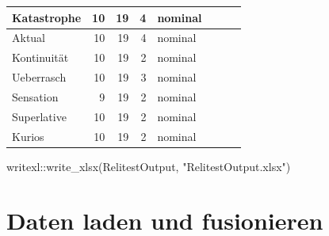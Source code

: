 \documentclass[twoside, pagesize, fontsize=11pt, dvipsnames]{scrreport}
\newenvironment{Shaded}{\begin{snugshade}}{\end{snugshade}}
\newcommand{\FunctionTok}[1]{\textcolor[rgb]{0.28,0.35,0.67}{#1}}
\newcommand{\NormalTok}[1]{\textcolor[rgb]{0.00,0.23,0.31}{#1}}
\newcommand{\SpecialCharTok}[1]{\textcolor[rgb]{0.37,0.37,0.37}{#1}}
\newcommand{\StringTok}[1]{\textcolor[rgb]{0.13,0.47,0.30}{#1}}
\begin{document}
\begin{table}
\begin{tabular}[t]{l|r|r|r|l|>{}r|>{}r|>{}r}
\hline
Katastrophe & 10 & 19 & 4 & nominal & \cellcolor[HTML]{E9D539}{\textcolor{black}{0.39}} & \cellcolor[HTML]{65FD69}{\textcolor{black}{0.81}} & \cellcolor[HTML]{75FE5C}{\textcolor{black}{0.74}}\\
\hline
Aktual & 10 & 19 & 4 & nominal & \cellcolor[HTML]{A91601}{\textcolor{white}{0.07}} & \cellcolor[HTML]{7A0403}{\textcolor{white}{0.56}} & \cellcolor[HTML]{7A0403}{\textcolor{white}{0.42}}\\
\hline
Kontinuität & 10 & 19 & 2 & nominal & \cellcolor[HTML]{ACFB38}{\textcolor{black}{0.49}} & \cellcolor[HTML]{4EF97D}{\textcolor{black}{0.82}} & \cellcolor[HTML]{EBD339}{\textcolor{black}{0.64}}\\
\hline
Ueberrasch & 10 & 19 & 3 & nominal & \cellcolor[HTML]{7A0403}{\textcolor{white}{0.01}} & \cellcolor[HTML]{DDE037}{\textcolor{black}{0.74}} & \cellcolor[HTML]{FBB838}{\textcolor{black}{0.61}}\\
\hline
Sensation & 9 & 19 & 2 & nominal & \cellcolor[HTML]{F8721C}{\textcolor{white}{0.24}} & \cellcolor[HTML]{DDE037}{\textcolor{black}{0.74}} & \cellcolor[HTML]{BC2002}{\textcolor{white}{0.47}}\\
\hline
Superlative & 10 & 19 & 2 & nominal & \cellcolor[HTML]{7A0403}{\textcolor{white}{0.01}} & \cellcolor[HTML]{4664DA}{\textcolor{white}{0.95}} & \cellcolor[HTML]{4680F6}{\textcolor{white}{0.91}}\\
\hline
Kurios & 10 & 19 & 2 & nominal & \cellcolor[HTML]{F15D13}{\textcolor{white}{0.21}} & \cellcolor[HTML]{92FF47}{\textcolor{black}{0.79}} & \cellcolor[HTML]{FEA130}{\textcolor{white}{0.59}}\\
\hline
\end{tabular}
\end{table}

\begin{Shaded}
\begin{Highlighting}[]

\NormalTok{writexl}\SpecialCharTok{::}\FunctionTok{write\_xlsx}\NormalTok{(RelitestOutput, }\StringTok{"RelitestOutput.xlsx"}\NormalTok{)}
\end{Highlighting}
\end{Shaded}


\hypertarget{daten-laden-und-fusionieren}{%
\chapter{Daten laden und
fusionieren}\label{daten-laden-und-fusionieren}}
\end{document}

